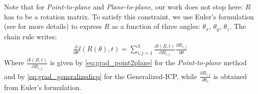 \documentclass[11pt,letterpaper,leqno]{article}
\begin{document}
Note that for \textit{Point-to-plane} and \textit{Plane-to-plane}, our work does not stop here: $R$ has to be a rotation matrix. To satisfy this constraint, we use Euler's formulation (see \cite{rotmat} for more details) to express $R$ as a function of three angles: $\theta_x, \, \theta_y, \, \theta_z$. The chain rule writes:
\begin{align*}
    \frac{\partial}{\partial \theta} l(R(\theta), t) = \sum_{i,j = 1}^3 \frac{\partial l(R, t)}{\partial R_{i,j}} \frac{\partial R_{i,j}}{\partial \theta}
\end{align*}
Where $\frac{\partial l(R, t)}{\partial R_{i,j}}$ is given by \eqref{eq:grad_point2plane} for the \textit{Point-to-plane} method and by \eqref{eq:grad_generalizedicp} for the Generalized-ICP, while $\frac{\partial R_{i,j}}{\partial \theta_x}$ is obtained from Euler's formulation.
\end{document}
